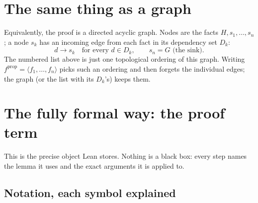 \documentclass{article}
\begin{document}
\section*{The same thing as a graph}

Equivalently, the proof is a directed acyclic graph. Nodes are the facts
$H, s_1, \dots, s_n$; a node $s_k$ has an incoming edge from each fact in its
dependency set $D_k$:
\[
  d \longrightarrow s_k \quad\text{for every } d \in D_k,
  \qquad s_n = G \text{ (the sink).}
\]
The numbered list above is just one topological ordering of this graph. Writing
$f^{\mathrm{prop}} = \langle f_1, \dots, f_n \rangle$ picks such an ordering and
then forgets the individual edges; the graph (or the list with its $D_k$'s) keeps
them.

\section*{The fully formal way: the proof term}

This is the precise object Lean stores. Nothing is a black box: every step names
the lemma it uses and the exact arguments it is applied to.

\subsection*{Notation, each symbol explained}
\end{document}
